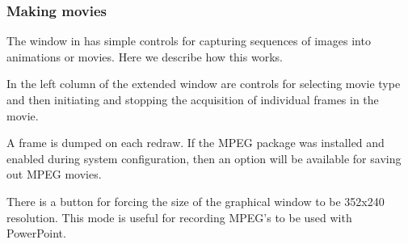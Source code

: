\subsubsection{Making movies}
\label{sec:view-movies} 

The \viewer{} window in \SR{} has simple controls for capturing sequences
of images into animations or movies.  Here we describe how this works.

In the left column of the extended \viewer{} window are controls for
selecting movie type and then initiating and stopping the acquisition of
individual frames in the movie.

A frame is dumped on each redraw.  If the MPEG package was installed
and enabled during system configuration, then an option will be
available for saving out MPEG movies.

There is a button for forcing the size of the graphical window to be
352x240 resolution.  This mode is useful for recording MPEG's to be
used with PowerPoint.
